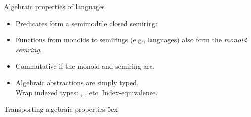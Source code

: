 \documentclass[aspectratio=169]{beamer}
\begin{document}
\begin{frame}{Algebraic properties of languages}
\begin{itemize}\itemsep4ex
\item Predicates form a semimodule closed semiring:
\item Functions from monoids to semirings (e.g., languages) also form the \emph{monoid semring}.
\item Commutative if the monoid and semiring are.
\item Algebraic abstractions are simply typed.\\[2ex]
      Wrap indexed types: { }, { }, etc.
      Index-equivalence.
\end{itemize}
\end{frame}

\rnc{}

\begin{frame}{Transporting algebraic properties}
\vspace{3ex}
\AgdaEmptySkip5ex
\end{frame}
\end{document}
